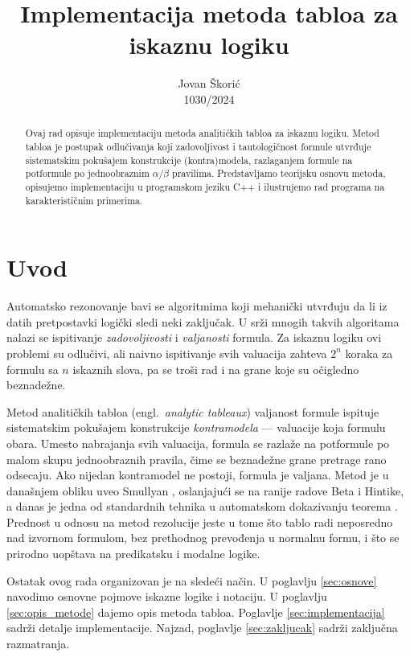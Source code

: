 \documentclass[a4paper,10pt]{article}
\title{Implementacija metoda tabloa za iskaznu logiku}
\author{Jovan Škorić\\ 1030/2024}
\begin{document}
\maketitle

\begin{abstract}
Ovaj rad opisuje implementaciju metoda analitičkih tabloa za iskaznu
logiku. Metod tabloa je postupak odlučivanja koji zadovoljivost i
tautolo\-gičnost formule utvrđuje sistematskim pokušajem konstrukcije
(kontra)modela, razlaganjem formule na potformule po jednoobraznim
$\alpha$/$\beta$ pravilima. Predstavljamo teorijsku osnovu metoda,
opisujemo implementaciju u programskom jeziku C++ i ilustrujemo rad
programa na karakterističnim primerima.
\end{abstract}

\section{Uvod}
\label{sec:uvod}

Automatsko rezonovanje bavi se algoritmima koji mehanički utvrđuju da li
iz datih pretpostavki logički sledi neki zaključak. U srži mnogih takvih
algoritama nalazi se ispitivanje \emph{zadovoljivosti} i \emph{valjanosti}
formula. Za iskaznu logiku ovi problemi su odlučivi, ali naivno ispitivanje
svih valuacija zahteva $2^n$ koraka za formulu sa $n$ iskaznih slova, pa se
troši rad i na grane koje su očigledno beznadežne.

Metod analitičkih tabloa (engl.\ \emph{analytic tab\-leaux}) valjanost formule
ispituje sistematskim pokušajem konstrukcije \emph{kontramodela} --- valuacije
koja formulu obara. Umesto nabrajanja svih valuacija, formula se razlaže na
potformule po malom skupu jednoobraznih pravila, čime se beznadežne grane
pretrage rano odsecaju. Ako nijedan kontramodel ne postoji, formula je valjana.
Metod je u današnjem obliku uveo Smullyan \cite{smullyan}, oslanjajući se na
ranije radove Beta i Hintike, a danas je jedna od standardnih tehnika u
automatskom dokazivanju teorema \cite{fitting, dagostino}. Prednost u odnosu na
metod rezolucije jeste u tome što tablo radi neposredno nad izvornom formulom,
bez prethodnog prevođenja u normalnu formu, i što se prirodno uopštava na
predikatsku i modalne logike.

Ostatak ovog rada organizovan je na sledeći način. U poglavlju
\ref{sec:osnove} navodimo osnovne pojmove iskazne logike i notaciju.
U poglavlju \ref{sec:opis_metode} dajemo opis metoda tabloa. Poglavlje
\ref{sec:implementacija} sadrži detalje implementacije. Najzad,
poglavlje \ref{sec:zakljucak} sadrži zaključna razmatranja.
\end{document}
